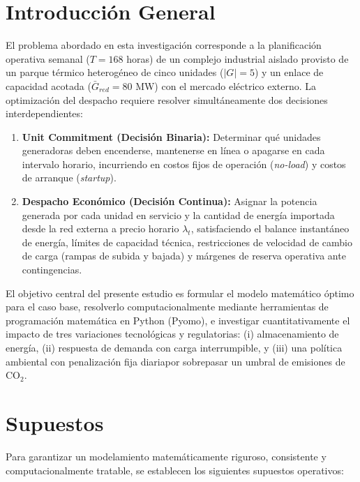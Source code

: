 \documentclass[10pt,letterpaper]{article}
\begin{document}
\newpage
\tableofcontents
\newpage

\setcounter{page}{1}

\section{Introducción General}
\label{sec:introduccion}

El problema abordado en esta investigación corresponde a la planificación operativa semanal ($T = 168$ horas) de un complejo industrial aislado provisto de un parque térmico heterogéneo de cinco unidades ($|G| = 5$) y un enlace de capacidad acotada ($\bar{G}_{red} = 80$ MW) con el mercado eléctrico externo. La optimización del despacho requiere resolver simultáneamente dos decisiones interdependientes:
\begin{enumerate}
    \item \textbf{Unit Commitment (Decisión Binaria):} Determinar qué unidades generadoras deben encenderse, mantenerse en línea o apagarse en cada intervalo horario, incurriendo en costos fijos de operación (\textit{no-load}) y costos de arranque (\textit{startup}).
    \item \textbf{Despacho Económico (Decisión Continua):} Asignar la potencia generada por cada unidad en servicio y la cantidad de energía importada desde la red externa a precio horario $\lambda_t$, satisfaciendo el balance instantáneo de energía, límites de capacidad técnica, restricciones de velocidad de cambio de carga (rampas de subida y bajada) y márgenes de reserva operativa ante contingencias.
\end{enumerate}

El objetivo central del presente estudio es formular el modelo matemático óptimo para el caso base, resolverlo computacionalmente mediante herramientas de programación matemática en Python (Pyomo), e investigar cuantitativamente el impacto de tres variaciones tecnológicas y regulatorias: (i) almacenamiento de energía, (ii) respuesta de demanda con carga interrumpible, y (iii) una política ambiental con penalización fija diariapor sobrepasar un umbral de emisiones de $\text{CO}_2$.

\section{Supuestos}
\label{sec:supuestos}

Para garantizar un modelamiento matemáticamente riguroso, consistente y computacionalmente tratable, se establecen los siguientes supuestos operativos:
\end{document}
